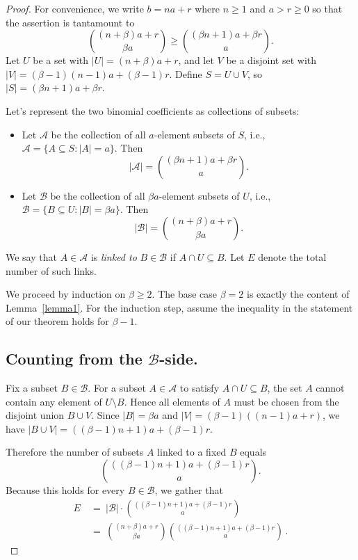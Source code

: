 \documentclass[10pt,a4paper]{amsart}
\begin{document}
\begin{proof} For convenience, we write $b=na+r$ where $n\geq1$ and $a>r\geq0$ so that the assertion is tantamount to
$$ \binom{(n+\beta)a+r}{\beta a} \ge \binom{(\beta n+1)a+\beta r}{a}.$$
 Let $U$ be a set with $|U| = (n+\beta)a+r$, and let $V$ be a disjoint set with $|V| = (\beta-1)(n-1)a+(\beta-1)r$. Define $S = U \cup V$, so $|S| = (\beta n+1)a+\beta r$. 

Let's represent the two binomial coefficients as collections of subsets:

\begin{itemize}
    \item Let $\mathcal{A}$ be the collection of all $a$-element subsets of $S$, i.e., $\mathcal{A} = \{ A \subseteq S : |A| = a \}$. Then
    $$
    |\mathcal{A}|=\binom{(\beta n+1)a+\beta r}{a}.
    $$

    \item Let $\mathcal{B}$ be the collection of all $\beta a$-element subsets of $U$, i.e., $\mathcal B = \{ B \subseteq U : |B| = \beta a \}$. Then
    $$
    |\mathcal{B}|=\binom{(n+\beta)a+r}{\beta a}.
    $$
\end{itemize}
We say that $A\in\mathcal{A}$ is \emph{linked to} $B\in\mathcal{B}$ if $A\cap U \subseteq B$.
Let $E$ denote the total number of such links.

We proceed by induction on $\beta\geq2$. The base case $\beta=2$ is exactly the content of Lemma~\ref{lemma1}. 
For the induction step, assume the inequality in the statement of our theorem holds for $\beta - 1$.

\subsection*{Counting from the $\mathcal{B}$-side.}

Fix a subset $B\in\mathcal{B}$. For a subset $A\in\mathcal{A}$ to satisfy $A\cap U\subseteq B$, the set $A$ cannot contain any element of $U\setminus B$. Hence all elements of $A$ must be chosen from the disjoint union $B\cup V$. Since $|B|=\beta a$ and $|V|=(\beta-1)((n-1)a+r)$, we have $|B\cup V|=((\beta-1)n+1)a+(\beta-1)r$.

Therefore the number of subsets $A$ linked to a fixed $B$ equals
$$
\binom{((\beta-1)n+1)a+(\beta-1)r}a.
$$
Because this holds for every $B\in\mathcal{B}$, we gather that
\begin{align*}
E  \ &= \ |\mathcal{B}|\cdot \binom{((\beta-1)n+1)a+(\beta-1)r}a \\ 
&= \ \binom{(n+\beta)a+r}{\beta a} \binom{((\beta-1)n+1)a+(\beta-1)r}a \, .
\end{align*}


\end{proof}
\end{document}
